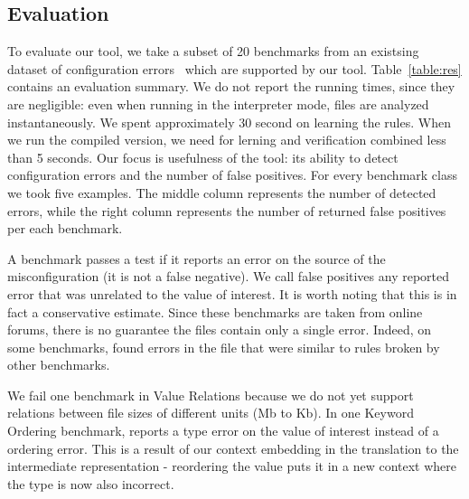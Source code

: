\subsection{Evaluation}

To evaluate our tool, we take a subset of 20 benchmarks from an existsing dataset of configuration errors~\cite{yin11anempirical, configdataset} which are supported by our tool. Table~\ref{table:res} contains an evaluation summary.
We do not report the running times, since they are negligible: even when
 running in the interpreter mode, files are analyzed instantaneously. We spent approximately 30 second on learning the rules. When we run the compiled version, we need for lerning and verification 
combined less than 5 seconds. Our focus is usefulness of the tool: its 
 ability to detect configuration errors and the number of false positives.
 For every benchmark class we took five examples. The middle column represents the number of detected errors, while the right column represents the number of returned false positives per each benchmark.
 


\iffalse{
We take the subset of benchmarks for which our tool has implemented rule modules.
Although our tool is general and extensible, we have only implemented four types of rules over the MySQL configuration language.
It would not make sense to run \app on misconfigurations for which there are no rule modules.}
\fi

A benchmark passes a test if it reports an error on the source of the misconfiguration (it is not a false negative).
We call false positives any reported error that was unrelated to the value of interest.
It is worth noting that this is in fact a conservative estimate.
Since these benchmarks are taken from online forums, there is no guarantee the files contain only a single error.
Indeed, on some benchmarks, \app found errors in the file that were similar to rules broken by other benchmarks. 

We fail one benchmark in Value Relations because we do not yet support relations between file sizes of different units (Mb to Kb).
In one Keyword Ordering benchmark, \app reports a type error on the value of interest instead of a ordering error.
This is a result of our context embedding in the translation to the intermediate representation - reordering the value puts it in a new context where the type is now also incorrect.

